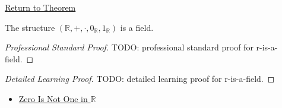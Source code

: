\newpage
{}
\label{prf:r-is-a-field}

\begin{remark*}[Return]
\hyperref[thm:r-is-a-field]{Return to Theorem}
\end{remark*}

\begin{theorem*}[$R$ Is a Field]
The structure $(\mathbb{R},+,\cdot,0_{\mathbb{R}},1_{\mathbb{R}})$ is a field.
\end{theorem*}

\begin{proof}[Professional Standard Proof]
\LRAProofBodyStart
TODO: professional standard proof for r-is-a-field.
\end{proof}

\begin{proof}[Detailed Learning Proof]
\LRAProofBodyStart
TODO: detailed learning proof for r-is-a-field.
\end{proof}

\begin{remark*}
\end{remark*}

\begin{dependencies}
\begin{itemize}
  \item \hyperref[thm:zero-not-one-in-r]{Zero Is Not One in $\mathbb{R}$}
\end{itemize}
\end{dependencies}

\clearpage
